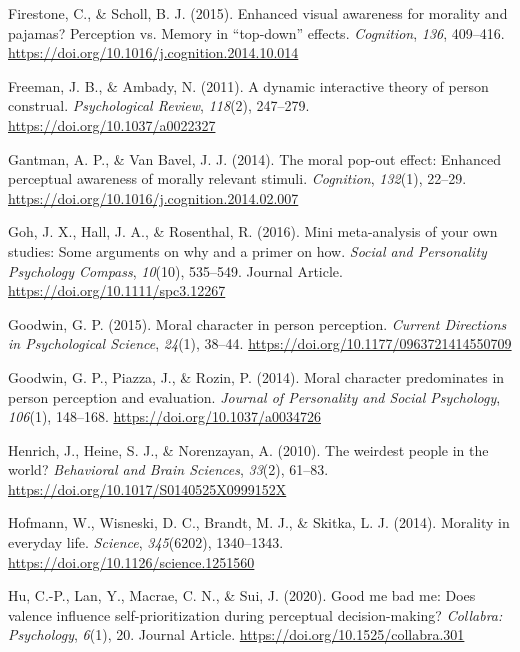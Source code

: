 \documentclass[
  english,
  man]{apa6}
\begin{document}
\leavevmode\hypertarget{ref-firestone_enhanced_2015}{}%
Firestone, C., \& Scholl, B. J. (2015). Enhanced visual awareness for morality and pajamas? Perception vs. Memory in ``top-down'' effects. \emph{Cognition}, \emph{136}, 409--416. \url{https://doi.org/10.1016/j.cognition.2014.10.014}

\leavevmode\hypertarget{ref-freeman_dynamic_2011}{}%
Freeman, J. B., \& Ambady, N. (2011). A dynamic interactive theory of person construal. \emph{Psychological Review}, \emph{118}(2), 247--279. \url{https://doi.org/10.1037/a0022327}

\leavevmode\hypertarget{ref-gantman_moral_2014}{}%
Gantman, A. P., \& Van Bavel, J. J. (2014). The moral pop-out effect: Enhanced perceptual awareness of morally relevant stimuli. \emph{Cognition}, \emph{132}(1), 22--29. \url{https://doi.org/10.1016/j.cognition.2014.02.007}

\leavevmode\hypertarget{ref-Goh_2016_mini}{}%
Goh, J. X., Hall, J. A., \& Rosenthal, R. (2016). Mini meta-analysis of your own studies: Some arguments on why and a primer on how. \emph{Social and Personality Psychology Compass}, \emph{10}(10), 535--549. Journal Article. \url{https://doi.org/10.1111/spc3.12267}

\leavevmode\hypertarget{ref-goodwin_moral_2015}{}%
Goodwin, G. P. (2015). Moral character in person perception. \emph{Current Directions in Psychological Science}, \emph{24}(1), 38--44. \url{https://doi.org/10.1177/0963721414550709}

\leavevmode\hypertarget{ref-goodwin_moral_2014}{}%
Goodwin, G. P., Piazza, J., \& Rozin, P. (2014). Moral character predominates in person perception and evaluation. \emph{Journal of Personality and Social Psychology}, \emph{106}(1), 148--168. \url{https://doi.org/10.1037/a0034726}

\leavevmode\hypertarget{ref-henrich_weirdest_2010}{}%
Henrich, J., Heine, S. J., \& Norenzayan, A. (2010). The weirdest people in the world? \emph{Behavioral and Brain Sciences}, \emph{33}(2), 61--83. \url{https://doi.org/10.1017/S0140525X0999152X}

\leavevmode\hypertarget{ref-hofmann_morality_2014}{}%
Hofmann, W., Wisneski, D. C., Brandt, M. J., \& Skitka, L. J. (2014). Morality in everyday life. \emph{Science}, \emph{345}(6202), 1340--1343. \url{https://doi.org/10.1126/science.1251560}

\leavevmode\hypertarget{ref-Hu_2020_GoodSelf}{}%
Hu, C.-P., Lan, Y., Macrae, C. N., \& Sui, J. (2020). Good me bad me: Does valence influence self-prioritization during perceptual decision-making? \emph{Collabra: Psychology}, \emph{6}(1), 20. Journal Article. \url{https://doi.org/10.1525/collabra.301}
\end{document}
